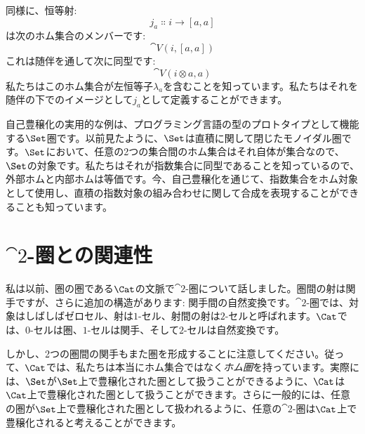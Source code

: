 同様に、恒等射: 
\[j_a \Colon i \to [a, a]\]
は次のホム集合のメンバーです: 
\[\cat{V}(i, [a, a])\]
これは随伴を通して次に同型です: 
\[\cat{V}(i \otimes a, a)\]
私たちはこのホム集合が左恒等子$\lambda_a$を含むことを知っています。私たちはそれを随伴の下でのイメージとして$j_a$として定義することができます。

自己豊穣化の実用的な例は、プログラミング言語の型のプロトタイプとして機能する$\Set$圏です。以前見たように、$\Set$は直積に関して閉じたモノイダル圏です。$\Set$において、任意の2つの集合間のホム集合はそれ自体が集合なので、$\Set$の対象です。私たちはそれが指数集合に同型であることを知っているので、外部ホムと内部ホムは等価です。今、自己豊穣化を通じて、指数集合をホム対象として使用し、直積の指数対象の組み合わせに関して合成を表現することができることも知っています。

\section{$\cat{2}$-圏との関連性}

私は以前、圏の圏である$\Cat$の文脈で$\cat{2}$-圏について話しました。圏間の射は関手ですが、さらに追加の構造があります: 関手間の自然変換です。$\cat{2}$-圏では、対象はしばしばゼロセル、射は$1$-セル、射間の射は$2$-セルと呼ばれます。$\Cat$では、$0$-セルは圏、$1$-セルは関手、そして$2$-セルは自然変換です。

しかし、2つの圏間の関手もまた圏を形成することに注意してください。従って、$\Cat$では、私たちは本当にホム集合ではなく\emph{ホム圏}を持っています。実際には、$\Set$が$\Set$上で豊穣化された圏として扱うことができるように、$\Cat$は$\Cat$上で豊穣化された圏として扱うことができます。さらに一般的には、任意の圏が$\Set$上で豊穣化された圏として扱われるように、任意の$\cat{2}$-圏は$\Cat$上で豊穣化されると考えることができます。

